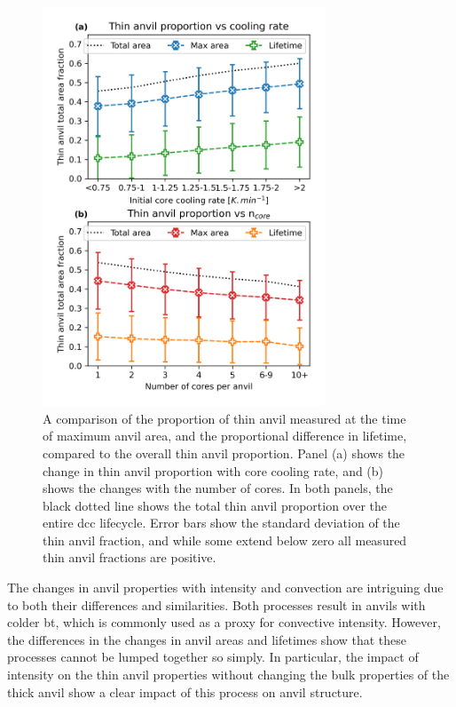 \begin{figure}[tp]
    \centering
    \includegraphics[width=0.75\textwidth]{figures/chapter3_08.png}
    \caption[
    A comparison of the proportion of thin anvil measured at the time of maximum anvil area, and the proportional difference in lifetime, compared to the overall thin anvil proportion.
    ]{
    A comparison of the proportion of thin anvil measured at the time of maximum anvil area, and the proportional difference in lifetime, compared to the overall thin anvil proportion. Panel (a) shows the change in thin anvil proportion with core cooling rate, and (b) shows the changes with the number of cores. In both panels, the black dotted line shows the total thin anvil proportion over the entire \acrshort{dcc} lifecycle. Error bars show the standard deviation of the thin anvil fraction, and while some extend below zero all measured thin anvil fractions are positive.
    }
    \label{fig:max_area_and_lifetime_contributions}
\end{figure}
The changes in anvil properties with intensity and convection are intriguing due to both their differences and similarities.
Both processes result in anvils with colder \acrshort{bt}, which is commonly used as a proxy for convective intensity.
However, the differences in the changes in anvil areas and lifetimes show that these processes cannot be lumped together so simply.
In particular, the impact of intensity on the thin anvil properties without changing the bulk properties of the thick anvil show a clear impact of this process on anvil structure.



